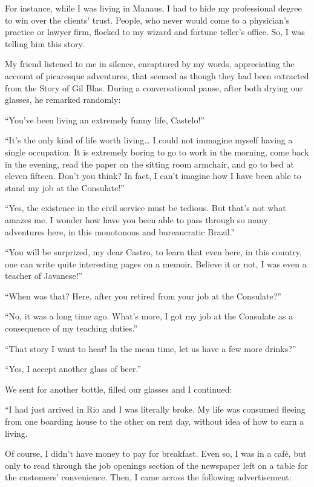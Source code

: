 \documentclass[a4paper,12pt]{book}
\begin{document}
For instance, while I was living in Manaus,
I had to hide my professional degree to win
over the clients' trust. People, who never would
come to a physician's practice or lawyer firm,
flocked to my wizard and fortune teller's office.
So, I was telling him this story.

My friend listened to me in silence,
enraptured by my words,
appreciating the account of picaresque adventures,
that seemed as though they had been
extracted from the Story of Gil Blas.
During a conversational pause,
after both drying our glasses,
he remarked randomly:

``You've been living an extremely funny life, Castelo!''

``It's the only kind of life worth living\ldots
I could not immagine
myself having a single occupation.
It is extremely boring
to go to work in the morning,
come back in the evening, read the paper
on the sitting room armchair,
and go to bed at eleven fifteen.
Don't you think?
In fact, I can't imagine how I have been
able to stand my job at the Consulate!''


``Yes, the existence in the civil service
must be tedious. But that's not
what amazes me. I wonder how have you been
able to pass through so many adventures here,
in this monotonous and bureaucratic Brazil.''

``You will be surprized, my dear Castro,
to learn that even here, in this country,
one can write quite interesting pages on a
memoir. Believe it or not,
I was even a teacher of Javanese!''

``When was that? Here, after you retired
from your job at the Consulate?''


``No, it was a long time ago.
What's more, I got my job at the
Consulate as a consequence of my
teaching duties.''

``That story I want to hear! In the mean time,
let us have a few more drinks?''

``Yes, I accept another glass of beer.''

We sent for another bottle, filled our glasses
and I continued:

``I had just arrived in Rio and I was literally broke.
My life was consumed fleeing
from one boarding house to
the other on rent day, without
idea of how to earn a living.

Of course, I didn't have money
to pay for breakfast.
Even so, I was in a café, but only to
read through the job openings section
of the newspaper left on a table
for the customers' convenience. Then, I came across
the following advertisement:
\end{document}
